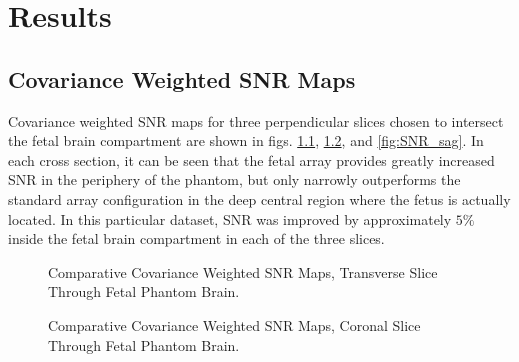 \chapter{Results}
\section{Covariance Weighted SNR Maps}

Covariance weighted SNR maps for three perpendicular slices chosen to intersect the fetal brain compartment are shown in
figs. \ref{fig:SNR_tra}, \ref{fig:SNR_cor}, and \ref{fig:SNR_sag}. In each cross section, it can be seen that the fetal
array provides greatly increased SNR in the periphery of the phantom, but only narrowly outperforms the standard array
configuration in the deep central region where the fetus is actually located. In this particular dataset, SNR was
improved by approximately $5\%$ inside the fetal brain compartment in each of the three slices. 

\begin{figure}
\caption{Comparative Covariance Weighted SNR Maps, Transverse Slice Through Fetal Phantom Brain.}
\label{fig:SNR_tra}
\end{figure}

\begin{figure}
\caption{Comparative Covariance Weighted SNR Maps, Coronal Slice Through Fetal Phantom Brain.}
\label{fig:SNR_cor}
\end{figure}

